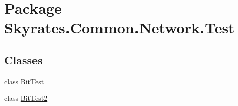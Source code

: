 \hypertarget{namespace_skyrates_1_1_common_1_1_network_1_1_test}{\section{Package Skyrates.\-Common.\-Network.\-Test}
\label{namespace_skyrates_1_1_common_1_1_network_1_1_test}
}
\subsection*{Classes}
\begin{DoxyCompactItemize}
\item 
class \hyperlink{class_skyrates_1_1_common_1_1_network_1_1_test_1_1_bit_test}{Bit\-Test}
\item 
class \hyperlink{class_skyrates_1_1_common_1_1_network_1_1_test_1_1_bit_test2}{Bit\-Test2}
\end{DoxyCompactItemize}
